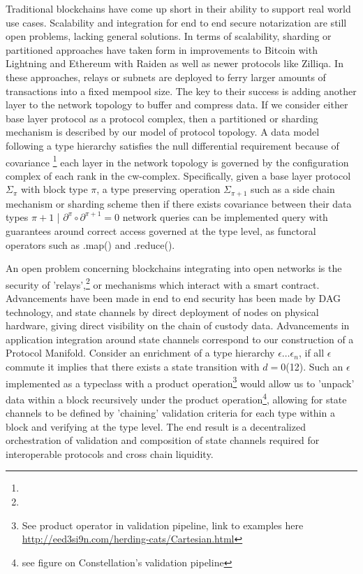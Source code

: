 \documentclass{article}
\begin{document}
Traditional blockchains have come up short in their ability to support real world use cases. Scalability and integration for end to end secure notarization are still open problems, lacking general solutions. In terms of scalability, sharding or partitioned approaches have taken form in improvements to Bitcoin with Lightning and Ethereum with Raiden as well as newer protocols like Zilliqa. In these approaches, relays or subnets are deployed to ferry larger amounts of transactions into a fixed mempool size. The key to their success is adding another layer to the network topology to buffer and compress data. If we consider either base layer protocol as a protocol complex, then a partitioned or sharding mechanism is described by our model of protocol topology. A data model following a type hierarchy satisfies the null differential requirement because of covariance \footnote{} each layer in the network topology is governed by the configuration complex of each rank in the cw-complex. Specifically, given a base layer protocol $\Sigma_\pi$ with block type $\pi$, a type preserving operation $\Sigma_{\pi+1}$ such as a side chain mechanism or sharding scheme then if there exists covariance between their data types $\pi+1$ | $\partial^\pi \circ \partial^{\pi+1} = 0$ network queries can be implemented query with guarantees around correct access governed at the type level, as functoral operators such as .map() and .reduce(). 

An open problem concerning blockchains integrating into open networks is the security of 'relays',\footnote{} or mechanisms which interact with a smart contract. Advancements have been made in end to end security has been made by DAG technology, and state channels by direct deployment of nodes on physical hardware, giving direct visibility on the chain of custody data. Advancements in application integration around state channels correspond to our construction of a Protocol Manifold. Consider an enrichment of a type hierarchy $\epsilon \dots \epsilon_{n}$, if all $\epsilon$ commute it implies that there exists a state transition with $d=0$(12). Such an $\epsilon$ implemented as a typeclass with a product operation\footnote{See product operator in validation pipeline, link to examples here \url{http://eed3si9n.com/herding-cats/Cartesian.html}} would allow us to ’unpack’ data within a block recursively under the product operation\footnote{see figure on Constellation's validation pipeline}, allowing for state channels to be defined by 'chaining' validation criteria for each type within a block and verifying at the type level. The end result is a decentralized orchestration of validation and composition of state channels required for interoperable protocols and cross chain liquidity.
\end{document}
